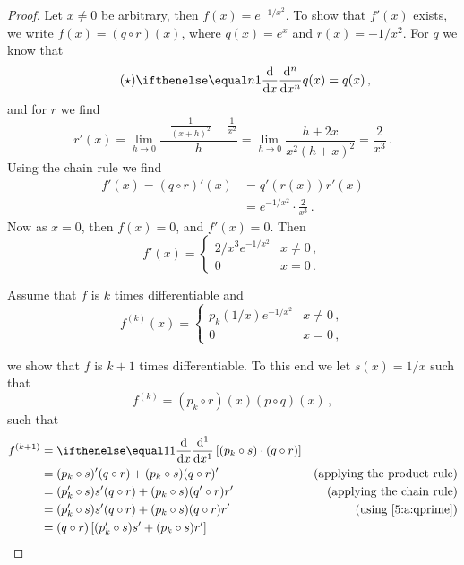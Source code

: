 \documentclass[week=6]{homework}
\begin{document}
\begin{questions}
\begin{parts}
\begin{proof}
	    		Let $x \neq 0$ be arbitrary, then $f(x) = e^{-1/x^2}$. To show that $f'(x)$ exists, we write $f(x) = (q\circ r)(x)$, where $q(x) = e^x$ and $r(x) = -1/x^2$.
	    		For $q$ we know that 
	    		\begin{equation} \label{5:a:qprime} \tag{$\star$}
		    		\diff[x][n]{}q(x) = q(x)\,,
	    		\end{equation}
	    		and for $r$ we find
	    		\[
		    		r'(x) = \lim_{h\to 0} \frac{-\frac{1}{(x+h)^2} + \frac{1}{x^2}}{h} = \lim_{h\to 0} \frac{h+2x}{x^2 (h+x)^2} = \frac{2}{x^3}\,.
	    		\]
	    		Using the chain rule we find
	    		\begin{align*}
	    			f'(x) = (q \circ r)'(x) &= q'(r(x))r'(x) \\
		    			&= e^{-1/x^2}\cdot\frac{2}{x^3}\,.
	    		\end{align*}
	    		Now as $x=0$, then $f(x) = 0$, and $f'(x) = 0$. Then
	    		\[
		    		f'(x) = \begin{cases} 2/x^3e^{-1/x^2} & x\neq 0\,, \\ 0 & x = 0\,. \end{cases}
	    		\]
	    		
	    		Assume that $f$ is $k$ times differentiable and
	    		\[
		    		f^{(k)}(x) = \begin{cases} p_k(1/x)e^{-1/x^2} & x\neq 0\,, \\ 0 & x = 0\,, \end{cases}
	    		\]
	    		
	    		we show that $f$ is $k+1$ times differentiable. To this end we let $s(x) = 1/x$ such that
	    		\[
		    		f^{(k)} = (p_k \circ r)(x)(p\circ q)(x)\,,
		    	\]
		    	such that
		    	\begin{align*}
		    		f^{(k+1)} &= \diff{} \left[(p_k \circ s)\cdot(q\circ r)\right] \\
		    		&= (p_k \circ s)'(q\circ r) + (p_k \circ s)(q\circ r)' & \mbox{(applying the product rule)} \\
		    		&= (p_k' \circ s)s' (q\circ r) + (p_k \circ s)(q' \circ r)r' & \mbox{(applying the chain rule)} \\
		    		&= (p_k' \circ s)s' (q\circ r) + (p_k \circ s)(q\circ r)r' & \mbox{(using \ref{5:a:qprime})} \\
		    		&= (q\circ r)\left[ (p_k' \circ s)s'  + (p_k \circ s)r' \right]\\
		    	\end{align*}
		    	

\end{proof}
\end{parts}
\end{questions}
\end{document}
